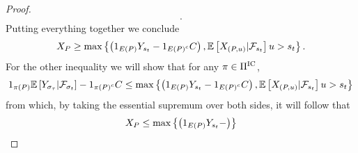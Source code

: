 \begin{proof}
\begin{align*}
{        } .
    \end{align*} 
    Putting everything together we conclude
    \begin{align*}
        X_{P}
        \geq
        \max\left\{
            \left(
                1_{
                    E\left(P\right)
                }
                Y_{s_{t}}
                -
                1_{
                    E\left(P\right)^c
                }
                C
            \right),
            \mathbb{E}\left[
                X_{
                    \left(
                        P, u
                    \right)
                }
                |
                \mathcal{F}_{s_{t}}
            \right]
            u
            > s_{t} 
        \right\} .
    \end{align*}  
    For the other inequality we will show that for any $\pi\in\Pi^{\text{IC}}$,
    \begin{align}
        1_{
            \pi\left(P\right)
        }
        \mathbb{E}\left[
            Y_{
                \sigma_{\tau}
            }
            | \mathcal{F}_{\sigma_{t}}
        \right]
        -
        1_{
            \pi\left(P\right)^c
        }
        C
        \leq 
        \max\left\{
            \left(
                1_{
                    E\left(P\right)
                }
                Y_{s_{t}}
                -
                1_{
                    E\left(P\right)^c
                }
                C
            \right),
            \mathbb{E}\left[
                X_{
                    \left(
                        P, u
                    \right)
                }
                |
                \mathcal{F}_{s_{t}}
            \right]
            u
            > s_{t} 
        \right\}
        \label{eq:ic-dp-proof}
    \end{align}  
    from which, by taking the essential supremum over both sides, it will follow that 
    \begin{align*}
        X_{P}
        \leq
        \max\left\{
            \left(
                1_{
                    E\left(P\right)
                }
                Y_{s_{t}}
                -
\right)\right\}
\end{align*}
\end{proof}
